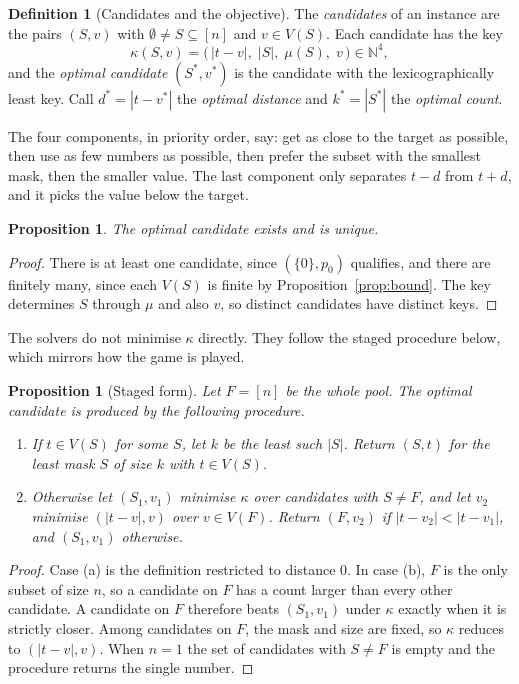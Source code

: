 \documentclass[11pt,a4paper]{article}
\newtheorem{proposition}[theorem]{Proposition}
\theoremstyle{definition}
\newtheorem{definition}[theorem]{Definition}
\theoremstyle{remark}
\newcommand{\N}{\mathbb{N}}
\newcommand{\mask}{\mu}
\begin{document}
\begin{definition}[Candidates and the objective]\label{def:objective}
The \emph{candidates} of an instance are the pairs $(S, v)$ with $\emptyset \ne S \subseteq [n]$ and
$v \in V(S)$. Each candidate has the key
\[
\kappa(S, v) = \bigl(\, |t - v|,\; |S|,\; \mask(S),\; v \,\bigr) \in \N^4,
\]
and the \emph{optimal candidate} $(S^*, v^*)$ is the candidate with the lexicographically least key.
Call $d^* = |t - v^*|$ the \emph{optimal distance} and $k^* = |S^*|$ the \emph{optimal count}.
\end{definition}

The four components, in priority order, say: get as close to the target as possible, then use as few
numbers as possible, then prefer the subset with the smallest mask, then the smaller value. The last
component only separates $t - d$ from $t + d$, and it picks the value below the target.

\begin{proposition}
The optimal candidate exists and is unique.
\end{proposition}

\begin{proof}
There is at least one candidate, since $(\{0\}, p_0)$ qualifies, and there are finitely many, since each $V(S)$
is finite by Proposition~\ref{prop:bound}. The key determines $S$ through $\mask$ and also $v$, so distinct
candidates have distinct keys.
\end{proof}

The solvers do not minimise $\kappa$ directly. They follow the staged procedure below, which mirrors how
the game is played.

\begin{proposition}[Staged form]\label{prop:staged}
Let $F = [n]$ be the whole pool. The optimal candidate is produced by the following procedure.
\begin{enumerate}[label=(\alph*)]
\item If $t \in V(S)$ for some $S$, let $k$ be the least such $|S|$. Return $(S, t)$ for the least mask $S$ of size
      $k$ with $t \in V(S)$.
\item Otherwise let $(S_1, v_1)$ minimise $\kappa$ over candidates with $S \ne F$, and let $v_2$ minimise
      $(|t - v|, v)$ over $v \in V(F)$. Return $(F, v_2)$ if $|t - v_2| < |t - v_1|$, and $(S_1, v_1)$ otherwise.
\end{enumerate}
\end{proposition}

\begin{proof}
Case (a) is the definition restricted to distance $0$. In case (b), $F$ is the only subset of size $n$, so a
candidate on $F$ has a count larger than every other candidate. A candidate on $F$ therefore beats
$(S_1, v_1)$ under $\kappa$ exactly when it is strictly closer. Among candidates on $F$, the mask and size
are fixed, so $\kappa$ reduces to $(|t - v|, v)$. When $n = 1$ the set of candidates with $S \neq F$ is empty
and the procedure returns the single number.
\end{proof}
\end{document}
